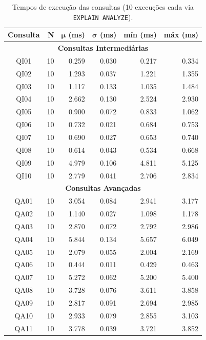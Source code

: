 \begin{table}[H]
\centering
\caption{Tempos de execu\c{c}\~ao das consultas (10 execu\c{c}\~oes cada via \texttt{EXPLAIN ANALYZE}).}
\label{tab:tempos-execucao}
\begin{tabular}{|c|r|r|r|r|r|}
\hline
\textbf{Consulta} & \textbf{N} & $\boldsymbol{\mu}$ \textbf{(ms)} & $\boldsymbol{\sigma}$ \textbf{(ms)} & \textbf{m\'in (ms)} & \textbf{m\'ax (ms)} \\
\hline
\multicolumn{6}{|c|}{\textbf{Consultas Intermedi\'arias}} \\
\hline
QI01 & 10 & 0.259 & 0.030 & 0.217 & 0.334 \\
QI02 & 10 & 1.293 & 0.037 & 1.221 & 1.355 \\
QI03 & 10 & 1.117 & 0.133 & 1.035 & 1.484 \\
QI04 & 10 & 2.662 & 0.130 & 2.524 & 2.930 \\
QI05 & 10 & 0.900 & 0.072 & 0.833 & 1.062 \\
QI06 & 10 & 0.732 & 0.021 & 0.684 & 0.753 \\
QI07 & 10 & 0.690 & 0.027 & 0.653 & 0.740 \\
QI08 & 10 & 0.614 & 0.043 & 0.534 & 0.668 \\
QI09 & 10 & 4.979 & 0.106 & 4.811 & 5.125 \\
QI10 & 10 & 2.779 & 0.041 & 2.706 & 2.834 \\
\hline
\multicolumn{6}{|c|}{\textbf{Consultas Avan\c{c}adas}} \\
\hline
QA01 & 10 & 3.054 & 0.084 & 2.941 & 3.177 \\
QA02 & 10 & 1.140 & 0.027 & 1.098 & 1.178 \\
QA03 & 10 & 2.870 & 0.072 & 2.792 & 2.986 \\
QA04 & 10 & 5.844 & 0.134 & 5.657 & 6.049 \\
QA05 & 10 & 2.079 & 0.055 & 2.004 & 2.169 \\
QA06 & 10 & 0.444 & 0.011 & 0.429 & 0.463 \\
QA07 & 10 & 5.272 & 0.062 & 5.200 & 5.400 \\
QA08 & 10 & 3.728 & 0.076 & 3.611 & 3.858 \\
QA09 & 10 & 2.817 & 0.091 & 2.694 & 2.985 \\
QA10 & 10 & 2.933 & 0.079 & 2.855 & 3.103 \\
QA11 & 10 & 3.778 & 0.039 & 3.721 & 3.852 \\

\end{tabular}
\end{table}
